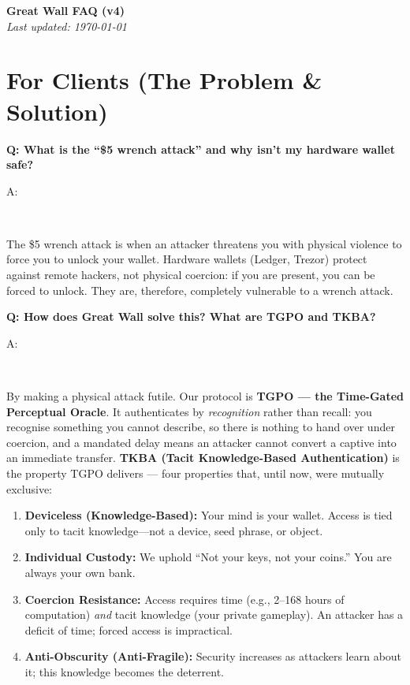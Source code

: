 \documentclass[12pt,a4paper]{article}
\newenvironment{question}[1]{%
  \vspace{0.8em}\noindent\textbf{Q: #1}\par
  \vspace{0.2em}\noindent\begin{itshape}A:\end{itshape}~%
}{\vspace{0.8em}}
\begin{document}
\begin{center}
  {\LARGE \textbf{Great Wall FAQ (v4)}}\\[0.3em]
  \textit{Last updated: \today}
\end{center}

\section{For Clients (The Problem \& Solution)}

\begin{question}{What is the ``\$5 wrench attack'' and why isn't my hardware wallet safe?}
The \$5 wrench attack is when an attacker threatens you with physical violence to force you to unlock your wallet. Hardware wallets (Ledger, Trezor) protect against remote hackers, not physical coercion: if you are present, you can be forced to unlock. They are, therefore, completely vulnerable to a wrench attack.
\end{question}

\begin{question}{How does Great Wall solve this? What are TGPO and TKBA?}
By making a physical attack futile. Our protocol is \textbf{TGPO --- the Time-Gated Perceptual Oracle}. It authenticates by \emph{recognition} rather than recall: you recognise something you cannot describe, so there is nothing to hand over under coercion, and a mandated delay means an attacker cannot convert a captive into an immediate transfer. \textbf{TKBA (Tacit Knowledge-Based Authentication)} is the property TGPO delivers --- four properties that, until now, were mutually exclusive:
\begin{enumerate}
  \item \textbf{Deviceless (Knowledge-Based):} Your mind is your wallet. Access is tied only to tacit knowledge—not a device, seed phrase, or object.
  \item \textbf{Individual Custody:} We uphold ``Not your keys, not your coins.'' You are always your own bank.
  \item \textbf{Coercion Resistance:} Access requires time (e.g., 2–168 hours of computation) \emph{and} tacit knowledge (your private gameplay). An attacker has a deficit of time; forced access is impractical.
  \item \textbf{Anti-Obscurity (Anti-Fragile):} Security increases as attackers learn about it; this knowledge becomes the deterrent.
\end{enumerate}
\end{question}
\end{document}
